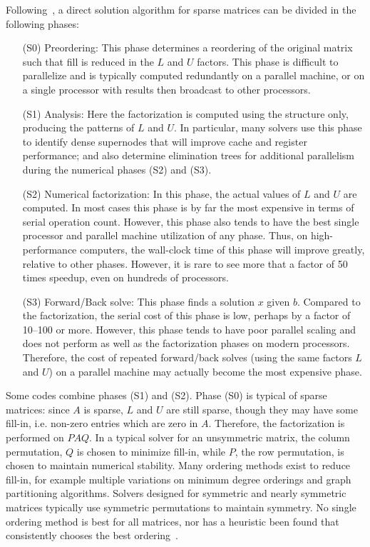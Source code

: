 \documentclass[acmtoms,acmnow]{acmtrans2m}
\begin{document}
Following~\cite[Chapter 6]{dongarra98numerical}, a direct solution algorithm
for sparse matrices can be divided in the following phases:
\begin{itemize}
\item[(S0)] Preordering:  This phase
determines a reordering of the original matrix such that fill is
reduced in the $L$ and $U$ factors.  This phase is difficult to
parallelize and is typically computed redundantly on a parallel
machine, or on a single processor with results then broadcast to
other processors.
\item[(S1)] Analysis:  Here the factorization is computed
using the structure only, producing the patterns of $L$ and $U$.  In
particular, many solvers use this phase to identify dense supernodes
that will improve cache and register performance; and also determine
elimination trees for additional parallelism during the numerical
phases (S2) and (S3).
\item[(S2)] Numerical factorization: In this phase, the actual values
of $L$ and $U$ are computed.  In most cases this phase is by far the
most expensive in terms of serial operation count. However, this
phase also tends to have the best single processor and parallel
machine utilization of any phase.  Thus, on high-performance
computers, the wall-clock time of this phase will improve greatly,
relative to other phases.  However, it is rare to see more that a
factor of 50 times speedup, even on hundreds of processors.
\item[(S3)] Forward/Back solve:  This phase finds a solution $x$ given $b$.
Compared to the factorization, the serial cost of this phase
is low, perhaps by a factor of 10--100 or more.  However, this phase
tends to have poor parallel scaling and does not perform as well as
the factorization phases on modern processors.  Therefore, the cost
of repeated forward/back solves (using the same factors $L$ and $U$)
on a parallel machine may actually become the most expensive phase.
\end{itemize}
Some codes combine phases (S1) and (S2). Phase (S0) is typical of
sparse matrices: since $A$ is sparse, $L$ and $U$ are still sparse,
though they may have some fill-in, i.e. non-zero entries which are
zero in $A$. Therefore, the factorization is performed on $PAQ$. In
a typical solver for an unsymmetric matrix, the column permutation,
$Q$ is chosen to minimize fill-in, while $P$, the row permutation,
is chosen to maintain numerical stability.
Many ordering methods exist to reduce fill-in, for example multiple variations
on minimum degree orderings and graph partitioning algorithms.  Solvers
designed for symmetric and nearly symmetric matrices typically use symmetric
permutations to maintain symmetry.  No single ordering method is best for all
matrices, nor has a heuristic been found that consistently chooses the best
ordering~\cite{BaumannFleischmannMutzbauer03,AmestoyDavisDuff03}.
\end{document}
